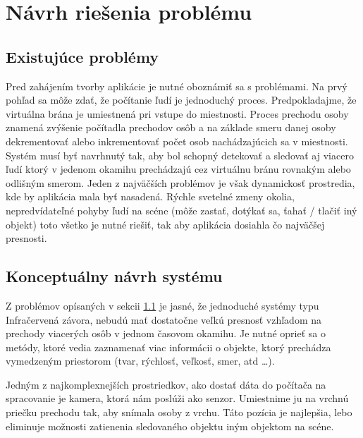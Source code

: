 \chapter{Návrh riešenia problému}
\section{Existujúce problémy}
\label{sec:problems}
Pred zahájením tvorby aplikácie je nutné oboznámiť sa s problémami. Na prvý pohľad  sa môže zdať, že  počítanie ľudí je jednoduchý proces. Predpokladajme, že virtuálna brána je umiestnená pri vstupe do miestnosti. Proces prechodu osoby znamená zvýšenie počítadla prechodov osôb a na základe smeru danej osoby dekrementovať alebo inkrementovať počet osob nachádzajúcich sa v miestnosti. Systém musí byť navrhnutý tak, aby bol schopný detekovať a sledovať aj viacero ľudí ktorý v jedenom okamihu prechádzajú cez virtuálnu bránu rovnakým alebo odlišným smerom.  Jeden z najväčších problémov je však dynamickosť prostredia, kde by aplikácia mala byť nasadená. Rýchle svetelné zmeny okolia,  nepredvídateľné pohyby ľudí na scéne (môže zastať, dotýkať sa, ťahať / tlačiť iný objekt)  toto všetko je nutné riešiť, tak aby aplikácia dosiahla čo najväčšej presnosti. 

\section{Konceptuálny návrh systému}
Z problémov opísaných v sekcii \ref{sec:problems} je jasné, že jednoduché systémy typu Infračervená závora, nebudú mať dostatočne veľkú presnosť vzhľadom na prechody viacerých osôb v jednom časovom okamihu. Je nutné oprieť sa o metódy, ktoré vedia zaznamenať viac informácii o objekte, ktorý prechádza vymedzeným priestorom (tvar, rýchlosť, veľkosť, smer, atd …). 

Jedným z najkomplexnejších prostriedkov, ako dostať dáta do počítača na spracovanie je kamera, ktorá nám poslúži ako senzor.  Umiestnime ju na vrchnú priečku prechodu tak, aby snímala osoby z vrchu. Táto pozícia je najlepšia, lebo eliminuje možnosti zatienenia sledovaného objektu iným objektom na scéne.  

